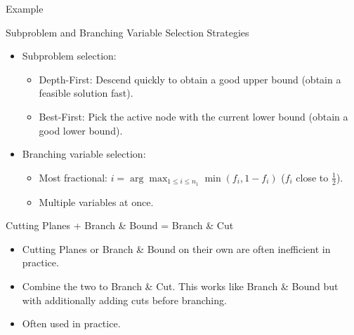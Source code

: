 \begin{frame}{Example}
\only<1>{
\begin{figure}
\centering

\end{figure}
}
\end{frame}

\begin{frame}{Subproblem and Branching Variable Selection Strategies}
\begin{itemize}
\item Subproblem selection:
\begin{itemize}
\item Depth-First: Descend quickly to obtain a good upper bound (obtain a feasible solution fast).
\item Best-First: Pick the active node with the current lower bound (obtain a good lower bound).
\end{itemize}

\item Branching variable selection:
\begin{itemize}
\item Most fractional: $i = \arg \max_{1 \leq i \leq n_1} \min (f_i, 1-f_i)$ ($f_i$ close to $\frac{1}{2}$).
\item Multiple variables at once.
\end{itemize}
\end{itemize}
\end{frame}

\begin{frame}{Cutting Planes + Branch \& Bound = Branch \& Cut }
\begin{itemize}
\item Cutting Planes or Branch \& Bound on their own are often inefficient in practice.
\item Combine the two to Branch \& Cut. This works like Branch \& Bound but with additionally adding cuts before branching. 
\item Often used in practice.
\end{itemize}
\end{frame}